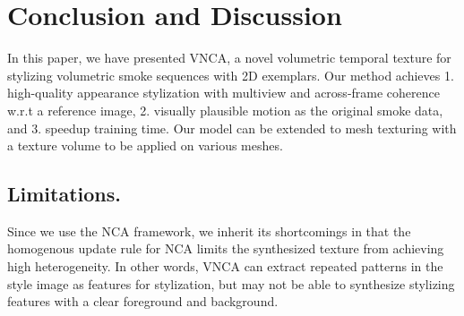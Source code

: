 \section{Conclusion and Discussion}

In this paper, we have presented VNCA, a novel volumetric temporal texture for stylizing volumetric smoke sequences with 2D exemplars. Our method achieves 1. high-quality appearance stylization with multiview and across-frame coherence w.r.t a reference image, 2. visually plausible motion as the original smoke data, and 3. speedup training time.
Our model can be extended to mesh texturing with a texture volume to be applied on various meshes.


\subsection{Limitations. }
Since we use the NCA framework, we inherit its shortcomings in that the homogenous update rule for NCA limits the synthesized texture from achieving high heterogeneity. 
In other words, VNCA can extract repeated patterns in the style image as features for stylization, but may not be able to synthesize stylizing features with a clear foreground and background.